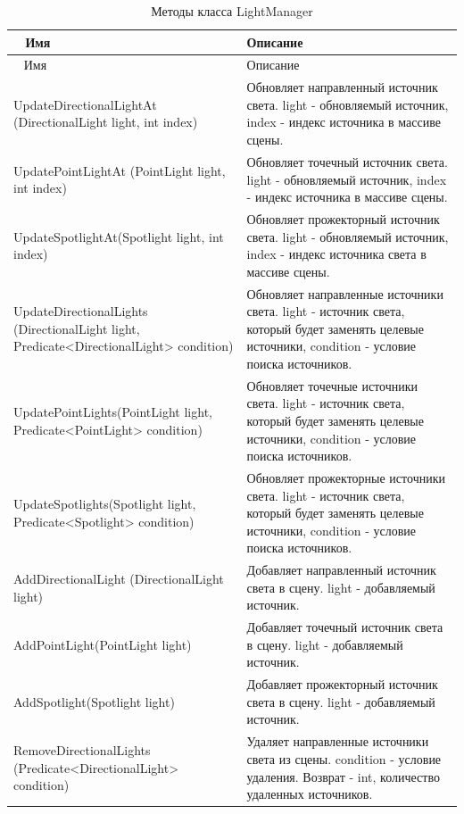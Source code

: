 \begin{xltabular}{\textwidth}{|>{\raggedright\arraybackslash}p{6cm}|>{\raggedright\arraybackslash}X|}
	\caption{Методы класса LightManager\label{table7:table}}\\ \hline
	~ \centrow Имя & \centrow Описание \\ \hline
	\endfirsthead
	~ \centrow Имя & \centrow Описание \\ \hline 
	\finishhead
	UpdateDirectionalLightAt
	(DirectionalLight light, int index) & Обновляет направленный источник света. light - обновляемый источник, index - индекс источника в массиве сцены. \\ \hline
	UpdatePointLightAt
	(PointLight light, int index) & Обновляет точечный источник света. light - обновляемый источник, index - индекс источника в массиве сцены. \\ \hline
	UpdateSpotlightAt(Spotlight light, int index) & Обновляет прожекторный источник света. light - обновляемый источник, index - индекс источника света в массиве сцены. \\ \hline
	UpdateDirectionalLights
	(DirectionalLight light, Predicate<DirectionalLight> condition) & Обновляет направленные источники света. light - источник света, который будет заменять целевые источники, condition - условие поиска источников. \\ \hline
	UpdatePointLights(PointLight light, Predicate<PointLight> condition) & Обновляет точечные источники света. light - источник света, который будет заменять целевые источники, condition - условие поиска источников. \\ \hline
	UpdateSpotlights(Spotlight light, Predicate<Spotlight> condition) & Обновляет прожекторные источники света. light - источник света, который будет заменять целевые источники, condition - условие поиска источников. \\ \hline
	AddDirectionalLight
	(DirectionalLight light) & Добавляет направленный источник света в сцену. light - добавляемый источник. \\ \hline
	AddPointLight(PointLight light) & Добавляет точечный источник света в сцену. light - добавляемый источник. \\ \hline
	AddSpotlight(Spotlight light) & Добавляет прожекторный источник света в сцену. light - добавляемый источник. \\ \hline
	RemoveDirectionalLights
	(Predicate<DirectionalLight> condition) & Удаляет направленные источники света из сцены. condition - условие удаления. Возврат - int, количество удаленных источников. \\ \hline

\end{xltabular}
